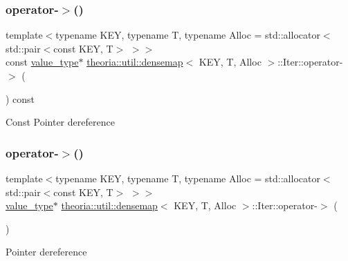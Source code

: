 \subsubsection{\texorpdfstring{operator-\/$>$()}{operator->()}\hspace{0.1cm}{\footnotesize\ttfamily [1/2]}}
{\footnotesize\ttfamily template$<$typename K\+EY, typename T, typename Alloc = std\+::allocator$<$std\+::pair$<$const K\+E\+Y, T$>$ $>$$>$ \\
const \hyperlink{classtheoria_1_1util_1_1densemap_1_1Iter_a8a1cedbd37c4faee8284d6f1debd49f2}{value\+\_\+type}$\ast$ \hyperlink{classtheoria_1_1util_1_1densemap}{theoria\+::util\+::densemap}$<$ K\+EY, T, Alloc $>$\+::Iter\+::operator-\/$>$ (\begin{DoxyParamCaption}{ }\end{DoxyParamCaption}) const\hspace{0.3cm}{\ttfamily [inline]}}

Const Pointer dereference \mbox{\label{classtheoria_1_1util_1_1densemap_1_1Iter_acf52921e292fe9aea8383a810dc54aa3}} 
\subsubsection{\texorpdfstring{operator-\/$>$()}{operator->()}\hspace{0.1cm}{\footnotesize\ttfamily [2/2]}}
{\footnotesize\ttfamily template$<$typename K\+EY, typename T, typename Alloc = std\+::allocator$<$std\+::pair$<$const K\+E\+Y, T$>$ $>$$>$ \\
\hyperlink{classtheoria_1_1util_1_1densemap_1_1Iter_a8a1cedbd37c4faee8284d6f1debd49f2}{value\+\_\+type}$\ast$ \hyperlink{classtheoria_1_1util_1_1densemap}{theoria\+::util\+::densemap}$<$ K\+EY, T, Alloc $>$\+::Iter\+::operator-\/$>$ (\begin{DoxyParamCaption}{ }\end{DoxyParamCaption})\hspace{0.3cm}{\ttfamily [inline]}}

Pointer dereference \mbox{\label{classtheoria_1_1util_1_1densemap_1_1Iter_a94ae1002beb5e2749b842b01f1e40a97}} 
